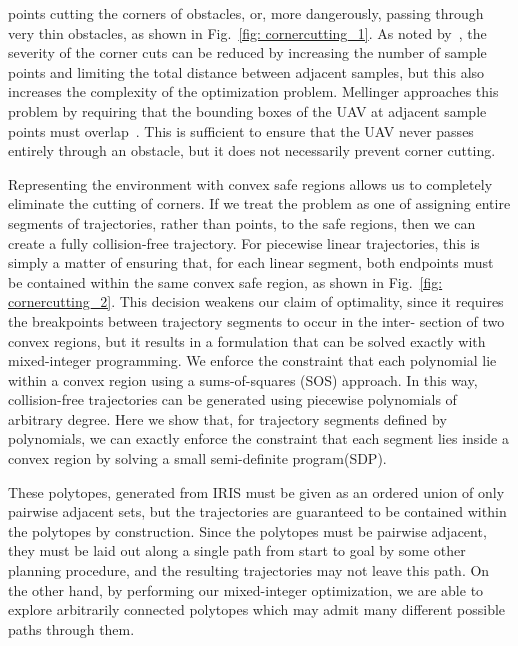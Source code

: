 points cutting the corners of obstacles, or, more dangerously,
passing through very thin obstacles, as shown in Fig.~\ref{fig: cornercutting_1}. As noted by~\cite{bellingham2002coordination}, the severity of the corner cuts
can be reduced by increasing the number of sample points
and limiting the total distance between adjacent samples,
but this also increases the complexity of the optimization problem. Mellinger approaches this problem by requiring
that the bounding boxes of the UAV at adjacent sample points
must overlap~\cite{mellinger2012mixed}. This is sufficient to ensure that the UAV
never passes entirely through an obstacle, but it does not
necessarily prevent corner cutting. 

Representing the environment with convex safe regions
allows us to completely eliminate the cutting of corners. If
we treat the problem as one of assigning entire segments
of trajectories, rather than points, to the safe regions, then
we can create a fully collision-free trajectory. For piecewise
linear trajectories, this is simply a matter of ensuring that, for
each linear segment, both endpoints must be contained within
the same convex safe region, as shown in Fig.~\ref{fig: cornercutting_2}. This decision weakens our claim of optimality, since it requires the
breakpoints between trajectory segments to occur in the inter-
section of two convex regions, but it results in a formulation
that can be solved exactly with mixed-integer programming.
We enforce the constraint that each polynomial lie within a
convex region using a sums-of-squares (SOS) approach. In
this way, collision-free trajectories can be generated using
piecewise polynomials of arbitrary degree. Here we show
that, for trajectory segments defined by polynomials, we can
exactly enforce the constraint that each segment lies inside
a convex region by solving a small semi-definite program(SDP).


These polytopes, generated from IRIS must be given as an ordered union of only
pairwise adjacent sets, but the trajectories are guaranteed to
be contained within the polytopes by construction. Since the polytopes must be pairwise adjacent, they must be laid out
along a single path from start to goal by some other planning
procedure, and the resulting trajectories may not leave this
path. On the other hand, by performing our mixed-integer
optimization, we are able to explore arbitrarily connected
polytopes which may admit many different possible paths
through them.





